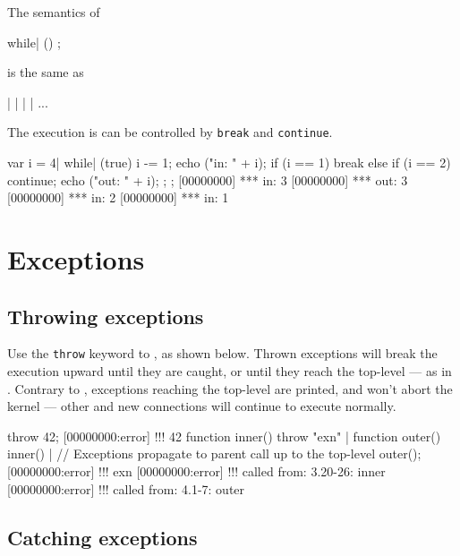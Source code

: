 The semantics of

\begin{urbiunchecked}
while| ()
  ;
\end{urbiunchecked}

\noindent
is the same as

\begin{urbiunchecked}
 |  |  |  | ...
\end{urbiunchecked}

The execution is can be controlled by \lstinline|break| and
\lstinline|continue|.

\begin{urbiscript}
{
  var i = 4|
  while| (true)
  {
    i -= 1;
    echo ("in: " + i);
    if (i == 1)
      break
    else if (i == 2)
      continue;
    echo ("out: " + i);
  };
};
[00000000] *** in: 3
[00000000] *** out: 3
[00000000] *** in: 2
[00000000] *** in: 1
\end{urbiscript}


\section{Exceptions}
\label{sec:lang:except}
\subsection{Throwing exceptions}

Use the \lstinline|throw| keyword to , as shown below. Thrown exceptions will
break the execution upward until they are caught, or until they reach
the top-level --- as in \Cxx.  Contrary to \Cxx, exceptions reaching
the top-level are printed, and won't abort the kernel --- other and new
connections will continue to execute normally.

\begin{urbiscript}
throw 42;
[00000000:error] !!! 42
function inner() { throw "exn" } |
function outer() { inner() }|
// Exceptions propagate to parent call up to the top-level
outer();
[00000000:error] !!! exn
[00000000:error] !!!    called from: 3.20-26: inner
[00000000:error] !!!    called from: 4.1-7: outer
\end{urbiscript}

\subsection{Catching exceptions}

